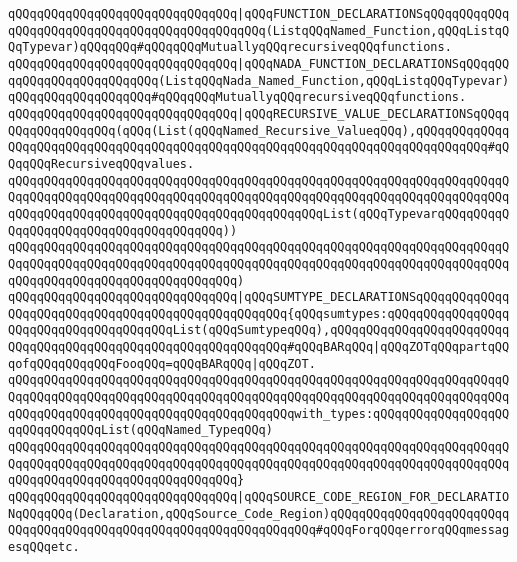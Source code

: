 \verb|qQQqqQQqqQQqqQQqqQQqqQQqqQQqqQQq|\verb#|qQQqFUNCTION_DECLARATIONSqQQqqQQqqQQqqQQqqQQqqQQqqQQqqQQqqQQqqQQqqQQqqQQq(ListqQQqNamed_Function,qQQqListqQQqTypevar)qQQqqQQq#\verb|#qQQqqQQqMutuallyqQQqrecursiveqQQqfunctions.|\newline
\verb|qQQqqQQqqQQqqQQqqQQqqQQqqQQqqQQq|\verb#|qQQqNADA_FUNCTION_DECLARATIONSqQQqqQQqqQQqqQQqqQQqqQQqqQQq(ListqQQqNada_Named_Function,qQQqListqQQqTypevar)qQQqqQQqqQQqqQQqqQQq#\verb|#qQQqqQQqMutuallyqQQqrecursiveqQQqfunctions.|\newline
\newline
\verb|qQQqqQQqqQQqqQQqqQQqqQQqqQQqqQQq|\verb#|qQQqRECURSIVE_VALUE_DECLARATIONSqQQqqQQqqQQqqQQqqQQq(qQQq(List(qQQqNamed_Recursive_ValueqQQq),qQQqqQQqqQQqqQQqqQQqqQQqqQQqqQQqqQQqqQQqqQQqqQQqqQQqqQQqqQQqqQQqqQQqqQQqqQQqqQQq#\verb|#qQQqqQQqRecursiveqQQqvalues.|\newline
\verb|qQQqqQQqqQQqqQQqqQQqqQQqqQQqqQQqqQQqqQQqqQQqqQQqqQQqqQQqqQQqqQQqqQQqqQQqqQQqqQQqqQQqqQQqqQQqqQQqqQQqqQQqqQQqqQQqqQQqqQQqqQQqqQQqqQQqqQQqqQQqqQQqqQQqqQQqqQQqqQQqqQQqqQQqqQQqqQQqqQQqqQQqList(qQQqTypevarqQQqqQQqqQQqqQQqqQQqqQQqqQQqqQQqqQQqqQQq))|\newline
\verb|qQQqqQQqqQQqqQQqqQQqqQQqqQQqqQQqqQQqqQQqqQQqqQQqqQQqqQQqqQQqqQQqqQQqqQQqqQQqqQQqqQQqqQQqqQQqqQQqqQQqqQQqqQQqqQQqqQQqqQQqqQQqqQQqqQQqqQQqqQQqqQQqqQQqqQQqqQQqqQQqqQQqqQQqqQQq)|\newline
\newline
\verb|qQQqqQQqqQQqqQQqqQQqqQQqqQQqqQQq|\verb#|qQQqSUMTYPE_DECLARATIONSqQQqqQQqqQQqqQQqqQQqqQQqqQQqqQQqqQQqqQQqqQQqqQQqqQQq{qQQqsumtypes:qQQqqQQqqQQqqQQqqQQqqQQqqQQqqQQqqQQqqQQqList(qQQqSumtypeqQQq),qQQqqQQqqQQqqQQqqQQqqQQqqQQqqQQqqQQqqQQqqQQqqQQqqQQqqQQqqQQqqQQq#\verb|#qQQqBARqQQq|\verb#|qQQqZOTqQQqpartqQQqofqQQqqQQqqQQqFooqQQq=qQQqBARqQQq|qQQqZOT.#\newline
\verb|qQQqqQQqqQQqqQQqqQQqqQQqqQQqqQQqqQQqqQQqqQQqqQQqqQQqqQQqqQQqqQQqqQQqqQQqqQQqqQQqqQQqqQQqqQQqqQQqqQQqqQQqqQQqqQQqqQQqqQQqqQQqqQQqqQQqqQQqqQQqqQQqqQQqqQQqqQQqqQQqqQQqqQQqqQQqqQQqqQQqwith_types:qQQqqQQqqQQqqQQqqQQqqQQqqQQqqQQqList(qQQqNamed_TypeqQQq)|\newline
\verb|qQQqqQQqqQQqqQQqqQQqqQQqqQQqqQQqqQQqqQQqqQQqqQQqqQQqqQQqqQQqqQQqqQQqqQQqqQQqqQQqqQQqqQQqqQQqqQQqqQQqqQQqqQQqqQQqqQQqqQQqqQQqqQQqqQQqqQQqqQQqqQQqqQQqqQQqqQQqqQQqqQQqqQQqqQQq}|\newline
\newline
\verb|qQQqqQQqqQQqqQQqqQQqqQQqqQQqqQQq|\verb#|qQQqSOURCE_CODE_REGION_FOR_DECLARATIONqQQqqQQq(Declaration,qQQqSource_Code_Region)qQQqqQQqqQQqqQQqqQQqqQQqqQQqqQQqqQQqqQQqqQQqqQQqqQQqqQQqqQQqqQQqqQQq#\verb|#qQQqForqQQqerrorqQQqmessagesqQQqetc.|\newline
